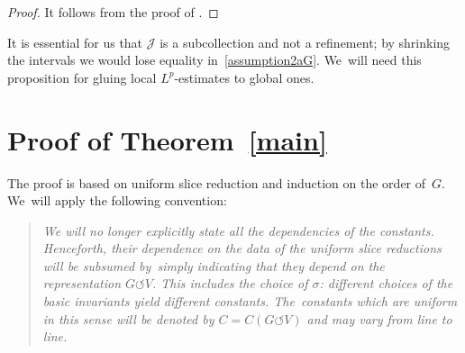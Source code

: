 \documentclass[pdftex]{sigma}
\numberwithin{equation}{section}
\def\si{\sigma}
\def\cJ{\mathcal{J}}
\def\acts{\circlearrowleft}
\begin{document}
\begin{proof}
 It follows from the proof of \cite[Proposition 2]{ParusinskiRainer15}.
\end{proof}


\begin{Remark} \label{rem:cover}
 It is essential for us that $\cJ$ is a subcollection and not a refinement; by shrinking the intervals we would
 lose equality in~\eqref{assumption2aG}. We~will need this proposition for gluing local $L^p$-estimates to global ones.
\end{Remark}





\section{Proof of \texorpdfstring{Theorem~\ref{main}}{Theorem 1.1}} \label{proof}

The proof is based on uniform slice reduction and induction on the order of~$G$. We~will apply the following convention:
\begin{quote}
 \it We will no longer explicitly state all the dependencies of the constants. Henceforth, their dependence on the
 data of the uniform slice reductions will be subsumed by~simply indicating that they depend on the representation
 $G \acts V$. This includes the choice of $\si$: different choices of the basic invariants yield different constants.
 The~constants which are uniform in this sense will be denoted by $C = C(G \acts V)$ and may vary from line to line.
\end{quote}
\end{document}
